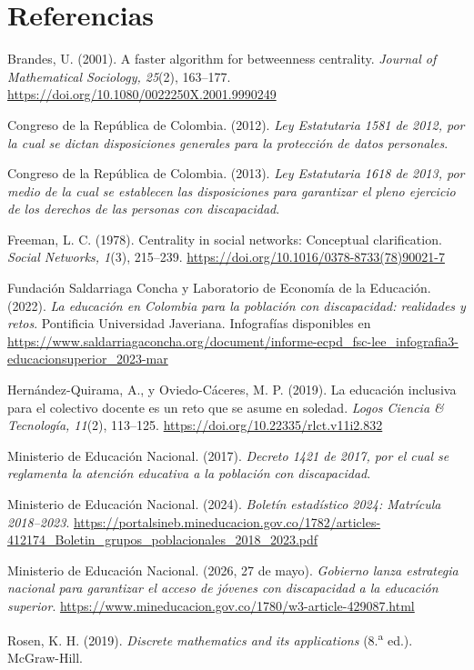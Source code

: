 \documentclass[12pt,letterpaper]{article}
\begin{document}
\section*{Referencias}
\begin{list}{}{\leftmargin=1.27cm \itemindent=-1.27cm \itemsep=5pt}
\item Brandes, U. (2001). A faster algorithm for betweenness centrality. \emph{Journal of Mathematical Sociology, 25}(2), 163--177. \url{https://doi.org/10.1080/0022250X.2001.9990249}
\item Congreso de la República de Colombia. (2012). \emph{Ley Estatutaria 1581 de 2012, por la cual se dictan disposiciones generales para la protección de datos personales}.
\item Congreso de la República de Colombia. (2013). \emph{Ley Estatutaria 1618 de 2013, por medio de la cual se establecen las disposiciones para garantizar el pleno ejercicio de los derechos de las personas con discapacidad}.
\item Freeman, L. C. (1978). Centrality in social networks: Conceptual clarification. \emph{Social Networks, 1}(3), 215--239. \url{https://doi.org/10.1016/0378-8733(78)90021-7}
\item Fundación Saldarriaga Concha y Laboratorio de Economía de la Educación. (2022). \emph{La educación en Colombia para la población con discapacidad: realidades y retos}. Pontificia Universidad Javeriana. Infografías disponibles en \url{https://www.saldarriagaconcha.org/document/informe-ecpd_fsc-lee_infografia3-educacionsuperior_2023-mar}
\item Hernández-Quirama, A., y Oviedo-Cáceres, M. P. (2019). La educación inclusiva para el colectivo docente es un reto que se asume en soledad. \emph{Logos Ciencia \& Tecnología, 11}(2), 113--125. \url{https://doi.org/10.22335/rlct.v11i2.832}
\item Ministerio de Educación Nacional. (2017). \emph{Decreto 1421 de 2017, por el cual se reglamenta la atención educativa a la población con discapacidad}.
\item Ministerio de Educación Nacional. (2024). \emph{Boletín estadístico 2024: Matrícula 2018--2023}. \url{https://portalsineb.mineducacion.gov.co/1782/articles-412174_Boletin_grupos_poblacionales_2018_2023.pdf}
\item Ministerio de Educación Nacional. (2026, 27 de mayo). \emph{Gobierno lanza estrategia nacional para garantizar el acceso de jóvenes con discapacidad a la educación superior}. \url{https://www.mineducacion.gov.co/1780/w3-article-429087.html}
\item Rosen, K. H. (2019). \emph{Discrete mathematics and its applications} (8.\textsuperscript{a} ed.). McGraw-Hill.
\end{list}
\end{document}
